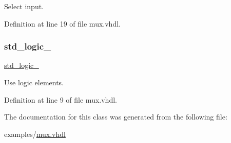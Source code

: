 Select input. 



Definition at line 19 of file mux.\+vhdl.

\mbox{\label{classmux__using__with_acd03516902501cd1c7296a98e22c6fcb}} 
\subsubsection{\texorpdfstring{std\+\_\+logic\+\_}{std\_logic\_1164}}
{\footnotesize\ttfamily \hyperlink{classmux__using__with_acd03516902501cd1c7296a98e22c6fcb}{std\+\_\+logic\+\_}\hspace{0.3cm}{\ttfamily [Package]}}



Use logic elements. 



Definition at line 9 of file mux.\+vhdl.



The documentation for this class was generated from the following file\+:\begin{DoxyCompactItemize}
\item 
examples/\hyperlink{mux_8vhdl}{mux.\+vhdl}\end{DoxyCompactItemize}
